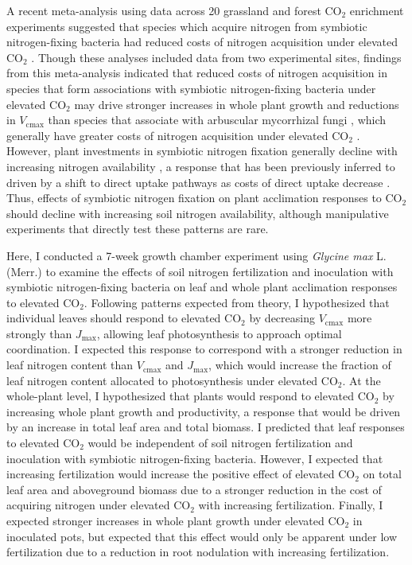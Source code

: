 A recent meta-analysis using data across 20 grassland and forest CO$_2$ enrichment experiments suggested that species which acquire nitrogen from symbiotic nitrogen-fixing bacteria had reduced costs of nitrogen acquisition under elevated CO$_2$ . Though these analyses included data from two experimental sites, findings from this meta-analysis indicated that reduced costs of nitrogen acquisition in species that form associations with symbiotic nitrogen-fixing bacteria under elevated CO$_2$ may drive stronger increases in whole plant growth and reductions in $V_\mathrm{cmax}$ than species that associate with arbuscular mycorrhizal fungi , which generally have greater costs of nitrogen acquisition under elevated CO$_2$ . However, plant investments in symbiotic nitrogen fixation generally decline with increasing nitrogen availability , a response that has been previously inferred to driven by a shift to direct uptake pathways as costs of direct uptake decrease . Thus, effects of symbiotic nitrogen fixation on plant acclimation responses to CO$_2$ should decline with increasing soil nitrogen availability, although manipulative experiments that directly test these patterns are rare.

Here, I conducted a 7-week growth chamber experiment using \textit{Glycine max} L. (Merr.) to examine the effects of soil nitrogen fertilization and inoculation with symbiotic nitrogen-fixing bacteria on leaf and whole plant acclimation responses to elevated CO$_2$. Following patterns expected from theory, I hypothesized that individual leaves should respond to elevated CO$_2$ by decreasing $V_\mathrm{cmax}$ more strongly than $J_\mathrm{max}$, allowing leaf photosynthesis to approach optimal coordination. I expected this response to correspond with a stronger reduction in leaf nitrogen content than $V_\mathrm{cmax}$ and $J_\mathrm{max}$, which would increase the fraction of leaf nitrogen content allocated to photosynthesis under elevated CO$_2$. At the whole-plant level, I hypothesized that plants would respond to elevated CO$_2$ by increasing whole plant growth and productivity, a response that would be driven by an increase in total leaf area and total biomass. I predicted that leaf responses to elevated CO$_2$ would be independent of soil nitrogen fertilization and inoculation with symbiotic nitrogen-fixing bacteria. However, I expected that increasing fertilization would increase the positive effect of elevated CO$_2$ on total leaf area and aboveground biomass due to a stronger reduction in the cost of acquiring nitrogen under elevated CO$_2$ with increasing fertilization. Finally, I expected stronger increases in whole plant growth under elevated CO$_2$ in inoculated pots, but expected that this effect would only be apparent under low fertilization due to a reduction in root nodulation with increasing fertilization.

